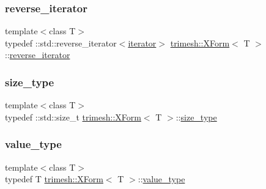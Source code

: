 \mbox{\label{classtrimesh_1_1XForm_a4729ea67a4ad434be421b066af3b672c}} 
\subsubsection{\texorpdfstring{reverse\+\_\+iterator}{reverse\_iterator}}
{\footnotesize\ttfamily template$<$class T$>$ \\
typedef \+::std\+::reverse\+\_\+iterator$<$\hyperlink{classtrimesh_1_1XForm_a8894e55e986e53231663e774060ca200}{iterator}$>$ \hyperlink{classtrimesh_1_1XForm}{trimesh\+::\+X\+Form}$<$ T $>$\+::\hyperlink{classtrimesh_1_1XForm_a4729ea67a4ad434be421b066af3b672c}{reverse\+\_\+iterator}}

\mbox{\label{classtrimesh_1_1XForm_aa219f141417c9026a74dec8b6279d4bf}} 
\subsubsection{\texorpdfstring{size\+\_\+type}{size\_type}}
{\footnotesize\ttfamily template$<$class T$>$ \\
typedef \+::std\+::size\+\_\+t \hyperlink{classtrimesh_1_1XForm}{trimesh\+::\+X\+Form}$<$ T $>$\+::\hyperlink{classtrimesh_1_1XForm_aa219f141417c9026a74dec8b6279d4bf}{size\+\_\+type}}

\mbox{\label{classtrimesh_1_1XForm_af259af02eaea86d3451dc23a47ad896c}} 
\subsubsection{\texorpdfstring{value\+\_\+type}{value\_type}}
{\footnotesize\ttfamily template$<$class T$>$ \\
typedef T \hyperlink{classtrimesh_1_1XForm}{trimesh\+::\+X\+Form}$<$ T $>$\+::\hyperlink{classtrimesh_1_1XForm_af259af02eaea86d3451dc23a47ad896c}{value\+\_\+type}}



